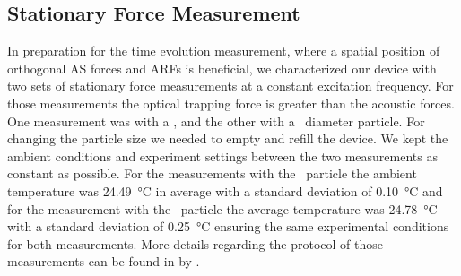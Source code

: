 
\subsection{Stationary Force Measurement}
In preparation for the time evolution measurement, where a spatial position of 
orthogonal AS forces and ARFs is beneficial, we characterized our device with 
two sets of stationary force measurements at a constant excitation frequency. 
For those measurements the optical trapping force is greater than the acoustic 
forces. One measurement was with a \Dtwo, and the other with a \Dfour~diameter 
particle. For changing the particle size we needed to empty and refill the 
device.  We kept the ambient conditions and experiment settings between the two 
measurements as constant as possible. For the measurements with the 
\Dtwo~particle the ambient temperature was \SI{24.49}{\celsius} in average with 
a standard deviation of \SI{0.10}{\celsius} and for the measurement with the 
\Dfour~particle the average temperature was \SI{24.78}{\celsius} with a 
standard deviation of \SI{0.25}{\celsius} ensuring the same experimental 
conditions for both measurements. More details regarding the protocol of those 
measurements can be found in \cite{Lamprecht2016} by 
\citeauthor{Lamprecht2016}.

